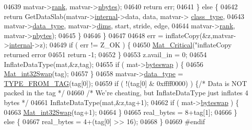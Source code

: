 \begin{DoxyCode}
{{{{{{{{{{{{{{{{{{{{{{{{{04639                         matvar->\hyperlink{group___m_a_t_a84ba70c96ded13cc555fa75b768d9921}{rank}, matvar->\hyperlink{group___m_a_t_abf1c844540503be2df9bb3db93cfe307}{nbytes});
04640                 \textcolor{keywordflow}{return} err;
04641             \} \textcolor{keywordflow}{else} \{
04642                 \textcolor{keywordflow}{return} GetDataSlab(matvar->\hyperlink{group___m_a_t_a6e97e3ed9f40c49322c18561c2a94e92}{internal}->data, data, matvar->
      \hyperlink{group___m_a_t_aff13035bf3265dd7d9425e5d40c839d4}{class\_type},
04643                     matvar->\hyperlink{group___m_a_t_ab6aafe9bd77f0f077852593dec438144}{data\_type}, matvar->\hyperlink{group___m_a_t_a8e01234e1c862ce3472bb37f5a09b92c}{dims}, start, stride, edge,
04644                     matvar->\hyperlink{group___m_a_t_a84ba70c96ded13cc555fa75b768d9921}{rank}, matvar->\hyperlink{group___m_a_t_abf1c844540503be2df9bb3db93cfe307}{nbytes});
04645             \}
04646         \}
04647 
04648         err = inflateCopy(&z,matvar->\hyperlink{group___m_a_t_a6e97e3ed9f40c49322c18561c2a94e92}{internal}->z);
04649         \textcolor{keywordflow}{if} ( err != Z\_OK ) \{
04650             \hyperlink{group__mat__util_gaf51f2bfbb5580f575e4dd79757e2b80c}{Mat\_Critical}(\textcolor{stringliteral}{"inflateCopy returned error %
04651             \textcolor{keywordflow}{return} -1;
04652         \}
04653         z.avail\_in = 0;
04654         InflateDataType(mat,&z,tag);
04655         \textcolor{keywordflow}{if} ( mat->\hyperlink{struct__mat__t_a99d207977af5e04941ace56d71817a40}{byteswap} ) \{
04656             \hyperlink{endian_8c_a2e0153996243f0a34df9a5286087cfa3}{Mat\_int32Swap}(tag);
04657         \}
04658         matvar->\hyperlink{group___m_a_t_ab6aafe9bd77f0f077852593dec438144}{data\_type} = \hyperlink{mat5_8c_a82bacecc4afc633b61bc3dc8ef88d1ed}{TYPE\_FROM\_TAG}(tag[0]);
04659         \textcolor{keywordflow}{if} ( !(tag[0] & 0xffff0000) ) \{\textcolor{comment}{/* Data is NOT packed in the tag */}
04660             \textcolor{comment}{/* We're cheating, but InflateDataType just inflates 4 bytes */}
04661             InflateDataType(mat,&z,tag+1);
04662             \textcolor{keywordflow}{if} ( mat->\hyperlink{struct__mat__t_a99d207977af5e04941ace56d71817a40}{byteswap} ) \{
04663                 \hyperlink{endian_8c_a2e0153996243f0a34df9a5286087cfa3}{Mat\_int32Swap}(tag+1);
04664             \}
04665             real\_bytes = 8+tag[1];
04666         \} \textcolor{keywordflow}{else} \{
04667             real\_bytes = 4+(tag[0] >> 16);
04668         \}
04669 \textcolor{preprocessor}{#endif}
}}}}}}}}}}}}}}}}}}}}}}}}}}
\end{DoxyCode}
